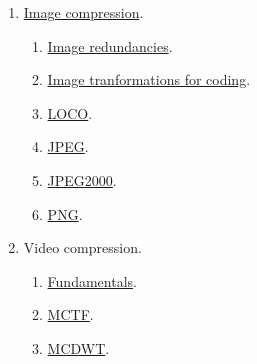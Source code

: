 \begin{enumerate}
\item \href{https://vicente-gonzalez-ruiz.github.io/vorbis/}{Image compression}.
  \begin{enumerate}
  \item \href{https://vicente-gonzalez-ruiz.github.io/image_redundancies/}{Image redundancies}.
  \item \href{https://vicente-gonzalez-ruiz.github.io/image_transformations_for_coding/}{Image tranformations for coding}.
  \item \href{https://cdn.rawgit.com/vicente-gonzalez-ruiz/LOCO/master/index.html}{LOCO}.
  \item \href{https://cdn.rawgit.com/vicente-gonzalez-ruiz/JPEG/master/index.html}{JPEG}.
  \item \href{https://cdn.rawgit.com/vicente-gonzalez-ruiz/JPEG2000/master/index.html}{JPEG2000}.
  \item \href{}{PNG}.
  \end{enumerate}
\item Video compression.
  \begin{enumerate}
  \item \href{https://cdn.rawgit.com/vicente-gonzalez-ruiz/video_compression/master/index.html}{Fundamentals}.
  \item \href{https://github.com/vicente-gonzalez-ruiz/MCTF-video-coding}{MCTF}.
  \item \href{https://github.com/Sistemas-Multimedia/MCDWT}{MCDWT}.
  \end{enumerate}
\end{enumerate}


